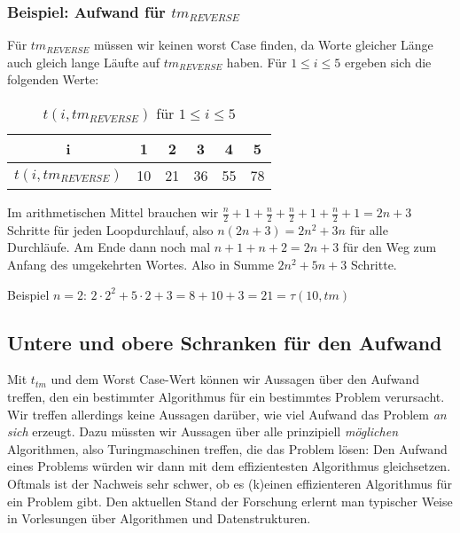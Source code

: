 \subsubsection{Beispiel: Aufwand für $tm_{REVERSE}$}

Für $tm_{REVERSE}$ müssen wir keinen worst Case finden,
da Worte gleicher Länge auch gleich lange Läufte auf $tm_{REVERSE}$ haben.
Für $1 \leq i \leq 5$ ergeben sich die folgenden Werte:

\begin{table}[ht]
    \caption{$t(i,tm_{REVERSE})$ für $1 \leq i \leq 5$}
    \centering
    \begin{tabular}{|c|c|c|c|c|c|}
    \hline
          i
        & 1
        & 2
        & 3
        & 4
        & 5 
        \\
        \hline
          $t(i,tm_{REVERSE})$
        & 10
        & 21
        & 36
        & 55
        & 78
        \\
    \hline
    \end{tabular}
    \label{tab:ttmreverse}
\end{table}

Im arithmetischen Mittel brauchen wir
$\frac{n}{2}+1+\frac{n}{2}+\frac{n}{2}+1+\frac{n}{2}+1 = 2n+3$
Schritte für jeden Loopdurchlauf, 
also
$n(2n + 3) = 2n^2 + 3n$ für alle Durchläufe.
Am Ende dann noch mal
$n + 1 + n + 2 = 2n + 3$ für den Weg zum Anfang des umgekehrten Wortes.
Also in Summe $2n^2 + 5n + 3$ Schritte.

Beispiel $n = 2$: $2\cdot2^2 + 5\cdot2 + 3 = 8 + 10 + 3 = 21 = \tau(10, tm)$
\subsection{Untere und obere Schranken für den Aufwand}
Mit $t_{tm}$ und dem Worst Case-Wert können wir Aussagen über den Aufwand treffen,
den ein bestimmter Algorithmus für ein bestimmtes Problem verursacht.
Wir treffen allerdings keine Aussagen darüber,
wie viel Aufwand das Problem \emph{an sich} erzeugt.
Dazu müssten wir Aussagen über alle prinzipiell \emph{möglichen} Algorithmen,
also Turingmaschinen treffen,
die das Problem lösen:
Den Aufwand eines Problems würden wir dann mit dem effizientesten Algorithmus gleichsetzen.
Oftmals ist der Nachweis sehr schwer,
ob es (k)einen effizienteren Algorithmus
für ein Problem gibt.
Den aktuellen Stand der Forschung erlernt man typischer Weise in Vorlesungen über
Algorithmen und Datenstrukturen.


